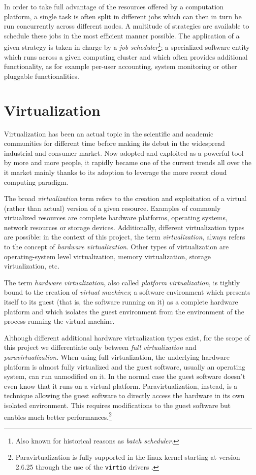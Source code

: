 In order to take full advantage of the resources offered by a computation platform, a single task is often split in different jobs which can then in turn be run concurrently across different nodes. A multitude of strategies are available to schedule these jobs in the most efficient manner possible. The application of a given strategy is taken in charge by a \emph{job scheduler}\footnote{Also known for historical reasons as \emph{batch scheduler}.}; a specialized software entity which runs across a given computing cluster and which often provides additional functionality, as for example per-user accounting, system monitoring or other pluggable functionalities.



\section{Virtualization}
\label{sec:virtualization}

Virtualization has been an actual topic in the scientific and academic communities for different time before making its debut in the widespread industrial and consumer market. Now adopted and exploited as a powerful tool by more and more people, it rapidly became one of the current trends all over the \gls{it} market mainly thanks to its adoption to leverage the more recent cloud computing paradigm.

The broad \emph{virtualization} term refers to the creation and exploitation of a virtual (rather than actual) version of a given resource. Examples of commonly virtualized resources are complete hardware platforms, operating systems, network resources or storage devices. Additionally, different virtualization types are possible: in the context of this project, the term \emph{virtualization}, always refers to the concept of \emph{hardware virtualization}. Other types of virtualization are operating-system level virtualization, memory virtualization, storage virtualization, etc.

The term \emph{hardware virtualization}, also called \emph{platform virtualization}, is tightly bound to the creation of \emph{virtual machines}; a software environment which presents itself to its guest (that is, the software running on it) as a complete hardware platform and which isolates the guest environment from the environment of the process running the virtual machine. 

Although different additional hardware virtualization types exist, for the scope of this project we differentiate only between \emph{full virtualization} and \emph{paravirtualization}. When using full virtualization, the underlying hardware platform is almost fully virtualized and the guest software, usually an operating system, can run unmodified on it. In the normal case the guest software doesn't even know that it runs on a virtual platform. Paravirtualization, instead, is a technique allowing the guest software to directly access the hardware in its own isolated environment. This requires modifications to the guest software but enables much better performances.\footnote{Paravirtualization is fully supported in the linux kernel starting at version 2.6.25 through the use of the \texttt{virtio} drivers \cite{virtio-www}.}

